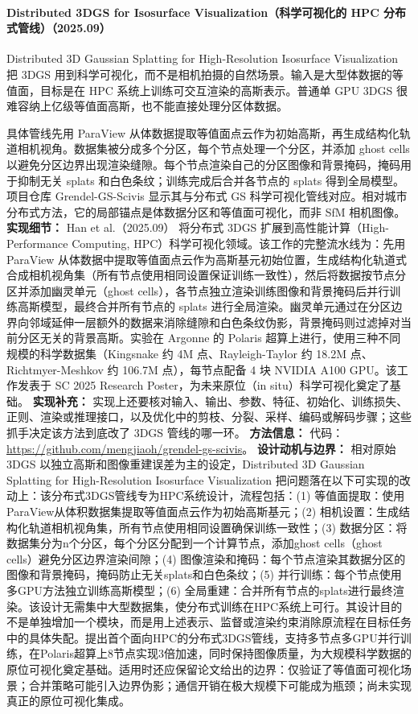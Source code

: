 \paragraph{Distributed 3DGS for Isosurface Visualization（科学可视化的 HPC 分布式管线）（2025.09）}
Distributed 3D Gaussian Splatting for High-Resolution Isosurface Visualization~\cite{2509_12138} 把 3DGS 用到科学可视化，而不是相机拍摄的自然场景。输入是大型体数据的等值面，目标是在 HPC 系统上训练可交互渲染的高斯表示。普通单 GPU 3DGS 很难容纳上亿级等值面高斯，也不能直接处理分区体数据。

具体管线先用 ParaView 从体数据提取等值面点云作为初始高斯，再生成结构化轨道相机视角。数据集被分成多个分区，每个节点处理一个分区，并添加 ghost cells 以避免分区边界出现渲染缝隙。每个节点渲染自己的分区图像和背景掩码，掩码用于抑制无关 splats 和白色条纹；训练完成后合并各节点的 splats 得到全局模型。项目仓库 Grendel-GS-Scivis 显示其与分布式 GS 科学可视化管线对应。相对城市分布式方法，它的局部锚点是体数据分区和等值面可视化，而非 SfM 相机图像。
\textbf{实现细节：} Han et al.（2025.09） 将分布式 3DGS 扩展到高性能计算（High-Performance Computing, HPC）科学可视化领域。该工作的完整流水线为：先用 ParaView 从体数据中提取等值面点云作为高斯基元初始位置，生成结构化轨道式合成相机视角集（所有节点使用相同设置保证训练一致性），然后将数据按节点分区并添加幽灵单元（ghost cells），各节点独立渲染训练图像和背景掩码后并行训练高斯模型，最终合并所有节点的 splats 进行全局渲染。幽灵单元通过在分区边界向邻域延伸一层额外的数据来消除缝隙和白色条纹伪影，背景掩码则过滤掉对当前分区无关的背景高斯。实验在 Argonne 的 Polaris 超算上进行，使用三种不同规模的科学数据集（Kingsnake 约 4M 点、Rayleigh-Taylor 约 18.2M 点、Richtmyer-Meshkov 约 106.7M 点），每节点配备 4 块 NVIDIA A100 GPU。该工作发表于 SC 2025 Research Poster，为未来原位（in situ）科学可视化奠定了基础。
\textbf{实现补充：} 实现上还要核对输入、输出、参数、特征、初始化、训练损失、正则、渲染或推理接口，以及优化中的剪枝、分裂、采样、编码或解码步骤；这些抓手决定该方法到底改了 3DGS 管线的哪一环。
\textbf{方法信息：} 代码：\url{https://github.com/mengjiaoh/grendel-gs-scivis}。
\textbf{设计动机与边界：} 相对原始 3DGS 以独立高斯和图像重建误差为主的设定，Distributed 3D Gaussian Splatting for High-Resolution Isosurface Visualization 把问题落在以下可实现的改动上：该分布式3DGS管线专为HPC系统设计，流程包括：(1) 等值面提取：使用ParaView从体积数据集提取等值面点云作为初始高斯基元；(2) 相机设置：生成结构化轨道相机视角集，所有节点使用相同设置确保训练一致性；(3) 数据分区：将数据集分为n个分区，每个分区分配到一个计算节点，添加ghost cells（ghost cells）避免分区边界渲染间隙；(4) 图像渲染和掩码：每个节点渲染其数据分区的图像和背景掩码，掩码防止无关splats和白色条纹；(5) 并行训练：每个节点使用多GPU方法独立训练高斯模型；(6) 全局重建：合并所有节点的splats进行最终渲染。该设计无需集中大型数据集，使分布式训练在HPC系统上可行。其设计目的不是单独增加一个模块，而是用上述表示、监督或渲染约束消除原流程在目标任务中的具体失配。提出首个面向HPC的分布式3DGS管线，支持多节点多GPU并行训练，在Polaris超算上8节点实现3倍加速，同时保持图像质量，为大规模科学数据的原位可视化奠定基础。适用时还应保留论文给出的边界：仅验证了等值面可视化场景；合并策略可能引入边界伪影；通信开销在极大规模下可能成为瓶颈；尚未实现真正的原位可视化集成。
